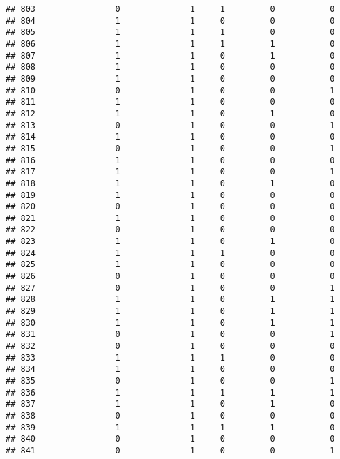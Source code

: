 \documentclass[]{article}
\begin{document}
\begin{verbatim}
## 803                0              1     1         0           0
## 804                1              1     0         0           0
## 805                1              1     1         0           0
## 806                1              1     1         1           0
## 807                1              1     0         1           0
## 808                1              1     0         0           0
## 809                1              1     0         0           0
## 810                0              1     0         0           1
## 811                1              1     0         0           0
## 812                1              1     0         1           0
## 813                0              1     0         0           1
## 814                1              1     0         0           0
## 815                0              1     0         0           1
## 816                1              1     0         0           0
## 817                1              1     0         0           1
## 818                1              1     0         1           0
## 819                1              1     0         0           0
## 820                0              1     0         0           0
## 821                1              1     0         0           0
## 822                0              1     0         0           0
## 823                1              1     0         1           0
## 824                1              1     1         0           0
## 825                1              1     0         0           0
## 826                0              1     0         0           0
## 827                0              1     0         0           1
## 828                1              1     0         1           1
## 829                1              1     0         1           1
## 830                1              1     0         1           1
## 831                0              1     0         0           1
## 832                0              1     0         0           0
## 833                1              1     1         0           0
## 834                1              1     0         0           0
## 835                0              1     0         0           1
## 836                1              1     1         1           1
## 837                1              1     0         1           0
## 838                0              1     0         0           0
## 839                1              1     1         1           0
## 840                0              1     0         0           0
## 841                0              1     0         0           1

\end{verbatim}
\end{document}
